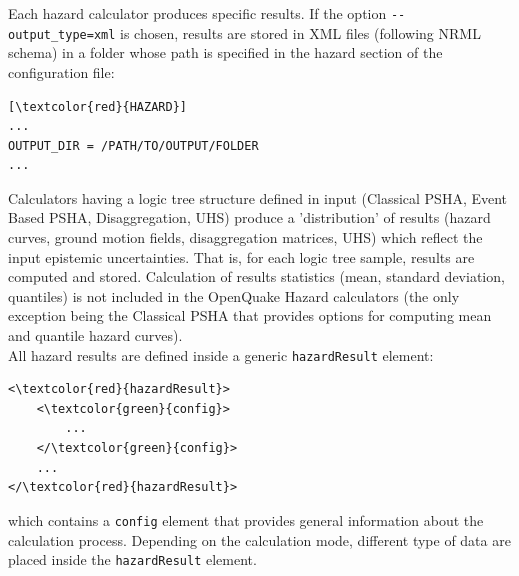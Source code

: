 Each hazard calculator produces specific results. If the option \Verb+--output_type=xml+ is chosen, results are stored in XML files (following NRML schema) in a folder whose path is specified in the hazard section of the configuration file:
\begin{Verbatim}[frame=single, commandchars=\\\{\}, samepage=true]
[\textcolor{red}{HAZARD}]
...
OUTPUT_DIR = /PATH/TO/OUTPUT/FOLDER
...
\end{Verbatim}
Calculators having a logic tree structure defined in input (Classical PSHA, Event Based PSHA, Disaggregation, UHS) produce a 'distribution' of results (hazard curves, ground motion fields, disaggregation matrices, UHS) which reflect the input epistemic uncertainties. That is,  for each logic tree sample, results are computed and stored. Calculation of results statistics (mean, standard deviation, quantiles) is not included in the OpenQuake Hazard calculators (the only exception being the Classical PSHA that provides options for computing mean and quantile hazard curves).\\
All hazard results are defined inside a generic \Verb+hazardResult+ element:
\begin{Verbatim}[frame=single, commandchars=\\\{\}, samepage=true]
<\textcolor{red}{hazardResult}>
	<\textcolor{green}{config}>
		...
	</\textcolor{green}{config}>
	...
</\textcolor{red}{hazardResult}>
\end{Verbatim}
which contains a \Verb+config+ element that provides general information about the calculation process. Depending on the calculation mode, different type of data are placed inside the \Verb+hazardResult+ element.

